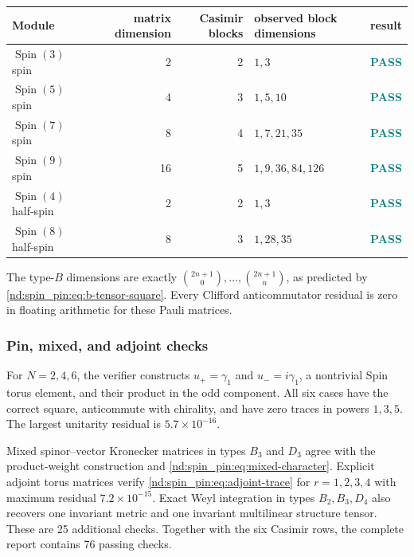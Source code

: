 \documentclass[10pt]{article}
\begin{document}
\begin{center}\small
\begin{tabularx}{\linewidth}{@{}lrrXc@{}}
\toprule
Module&matrix dimension&Casimir blocks&observed block dimensions&result\\
\midrule
$\operatorname{Spin}(3)$ spin&2&2&$1,3$&\textcolor{teal}{\textbf{PASS}}\\
$\operatorname{Spin}(5)$ spin&4&3&$1,5,10$&\textcolor{teal}{\textbf{PASS}}\\
$\operatorname{Spin}(7)$ spin&8&4&$1,7,21,35$&\textcolor{teal}{\textbf{PASS}}\\
$\operatorname{Spin}(9)$ spin&16&5&$1,9,36,84,126$&\textcolor{teal}{\textbf{PASS}}\\
$\operatorname{Spin}(4)$ half-spin&2&2&$1,3$&\textcolor{teal}{\textbf{PASS}}\\
$\operatorname{Spin}(8)$ half-spin&8&3&$1,28,35$&\textcolor{teal}{\textbf{PASS}}\\
\bottomrule
\end{tabularx}
\end{center}

The type-$B$ dimensions are exactly
$\binom{2n+1}{0},\ldots,\binom{2n+1}{n}$, as predicted by
\eqref{nd:spin_pin:eq:b-tensor-square}.  Every Clifford anticommutator residual is zero
in floating arithmetic for these Pauli matrices.

\subsubsection{Pin, mixed, and adjoint checks}

For $N=2,4,6$, the verifier constructs $u_+=\gamma_1$ and
$u_-=i\gamma_1$, a nontrivial Spin torus element, and their product in the
odd component.  All six cases have the correct square, anticommute with
chirality, and have zero traces in powers $1,3,5$.  The largest unitarity
residual is $5.7\times10^{-16}$.

Mixed spinor--vector Kronecker matrices in types $B_3$ and $D_3$ agree with
the product-weight construction and \eqref{nd:spin_pin:eq:mixed-character}.  Explicit
adjoint torus matrices verify \eqref{nd:spin_pin:eq:adjoint-trace} for $r=1,2,3,4$ with
maximum residual $7.2\times10^{-15}$.  Exact Weyl integration in types
$B_2,B_3,D_4$ also recovers one invariant metric and one invariant
multilinear structure tensor.  These are 25 additional checks.  Together
with the six Casimir rows, the complete report contains 76 passing checks.
\end{document}
